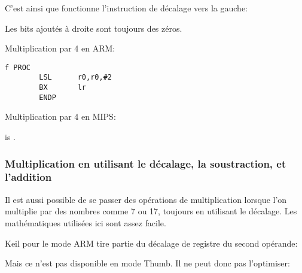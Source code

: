 C'est ainsi que fonctionne l'instruction de décalage vers la gauche:



Les bits ajoutés à droite sont toujours des zéros.

Multiplication par 4 en ARM:

\begin{lstlisting}[caption=\NonOptimizingKeilVI (\ARMMode),style=customasmARM]
f PROC
        LSL      r0,r0,#2
        BX       lr
        ENDP
\end{lstlisting}

Multiplication par 4 en MIPS:



 is .

\subsubsection{Multiplication en utilisant le décalage, la soustraction, et l'addition}
\label{multiplication_using_shifts_adds_subs}

Il est aussi possible de se passer des opérations de multiplication lorsque l'on
multiplie par des nombres comme 7 ou 17, toujours en utilisant le décalage.
Les mathématiques utilisées ici sont assez facile.








Keil pour le mode ARM tire partie du décalage de registre du second opérande:



Mais ce n'est pas disponible en mode Thumb.
Il ne peut donc pas l'optimiser:



